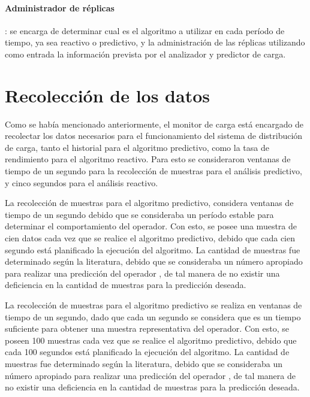 \paragraph{Administrador de réplicas}: se encarga de determinar cual es el algoritmo a utilizar en cada período de tiempo, ya sea reactivo o predictivo, y la administración de las réplicas utilizando como entrada la información prevista por el analizador y predictor de carga.

\section{Recolección de los datos}

Como se había mencionado anteriormente, el monitor de carga está encargado de recolectar los datos necesarios para el funcionamiento del sistema de distribución de carga, tanto el historial para el algoritmo predictivo, como la tasa de rendimiento para el algoritmo reactivo. Para esto se consideraron ventanas de tiempo de un segundo para la recolección de muestras para el análisis predictivo, y cinco segundos para el análisis reactivo.

La recolección de muestras para el algoritmo predictivo, considera ventanas de tiempo de un segundo debido que se consideraba un período estable para determinar el comportamiento del operador. Con esto, se posee una muestra de cien datos cada vez que se realice el algoritmo predictivo, debido que cada cien segundo está planificado la ejecución del algoritmo. La cantidad de muestras fue determinado según la literatura, debido que se consideraba un número apropiado para realizar una predicción del operador \citep{ching2006markov}, de tal manera de no existir una deficiencia en la cantidad de muestras para la predicción deseada.

La recolección de muestras para el algoritmo predictivo se realiza en ventanas de tiempo de un segundo, dado que cada un segundo se considera que es un tiempo suficiente para obtener una muestra representativa del operador. Con esto, se poseen 100 muestras cada vez que se realice el algoritmo predictivo, debido que cada 100 segundos está planificado la ejecución del algoritmo. La cantidad de muestras fue determinado según la literatura, debido que se consideraba un número apropiado para realizar una predicción del operador \citep{ching2006markov}, de tal manera de no existir una deficiencia en la cantidad de muestras para la predicción deseada.

